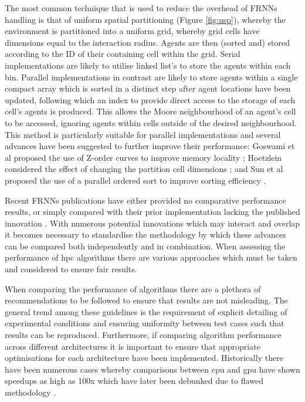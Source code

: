   The most common technique that is used to reduce the overhead of FRNNs handling is that of uniform spatial partitioning (Figure \ref{fig:usp}), whereby the environment is partitioned into a uniform grid, whereby grid cells have dimensions equal to the interaction radius. Agents are then (sorted and) stored according to the ID of their containing cell within the grid. Serial implementations are likely to utilise linked list's to store the agents within each bin. Parallel implementations in contrast are likely to store agents within a single compact array which is sorted in a distinct step after agent locations have been updated, following which an index to provide direct access to the storage of each cell’s agents is produced. This allows the Moore neighbourhood of an agent’s cell to be accessed, ignoring agents within cells outside of the desired neighbourhood. This method is particularly suitable for parallel implementations \cite{Gre10} and several advances have been suggested to further improve their performance: Goswami et al proposed the use of Z-order curves to improve memory locality \cite{GS*10}; Hoetzlein considered the effect of changing the partition cell dimensions \cite{Hoe14}; and Sun et al proposed the use of a parallel ordered sort to improve sorting efficiency \cite{HY*15}.

  Recent FRNNs publications have either provided no comparative performance results, or simply compared with their prior implementation lacking the published innovation \cite{GS*10,Hoe14,HY*15}. With numerous potential innovations which may interact and overlap it becomes necessary to standardise the methodology by which these advances can be compared both independently and in combination. When assessing the performance of \gls{hpc} algorithms there are various approaches which must be taken and considered to ensure fair results.
  
  When comparing the performance of algorithms there are a plethora of recommendations to be followed to ensure that results are not misleading\cite{Bai92}. The general trend among these guidelines is the requirement of explicit detailing of experimental conditions and ensuring uniformity between test cases such that results can be reproduced. Furthermore, if comparing algorithm performance across different architectures it is important to ensure that appropriate optimisations for each architecture have been implemented. Historically there have been numerous cases whereby comparisons between \gls{cpu} and \gls{gpu} have shown speedups as high as 100x which have later been debunked due to flawed methodology \cite{LK*10}.

